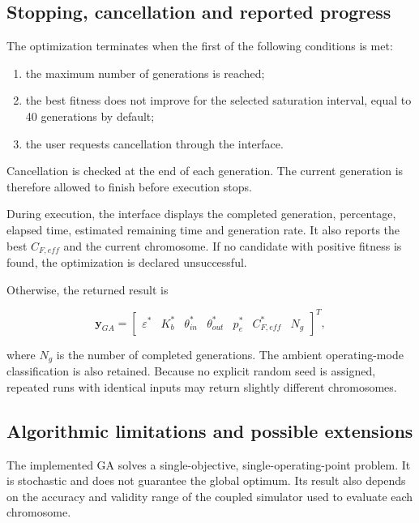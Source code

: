 \subsection{Stopping, cancellation and reported progress}

The optimization terminates when the first of the following conditions is met:

\begin{enumerate}
    \item the maximum number of generations is reached;
    \item the best fitness does not improve for the selected saturation interval,
    equal to 40 generations by default;
    \item the user requests cancellation through the interface.
\end{enumerate}

Cancellation is checked at the end of each generation. The current generation is
therefore allowed to finish before execution stops.

During execution, the interface displays the completed generation, percentage,
elapsed time, estimated remaining time and generation rate. It also reports the best
\(C_{F,eff}\) and the current chromosome. If no candidate with positive fitness is
found, the optimization is declared unsuccessful.

Otherwise, the returned result is

\begin{equation}
\bm{y}_{GA}
=
\begin{bmatrix}
\varepsilon^* &
K_b^* &
\theta_{in}^* &
\theta_{out}^* &
p_e^* &
C_{F,eff}^* &
N_g
\end{bmatrix}^{T},
\label{eq:ga_output}
\end{equation}

where \(N_g\) is the number of completed generations. The ambient operating-mode
classification is also retained. Because no explicit random seed is assigned,
repeated runs with identical inputs may return slightly different chromosomes.


\subsection{Algorithmic limitations and possible extensions}

The implemented GA solves a single-objective, single-operating-point problem. It is
stochastic and does not guarantee the global optimum. Its result also depends on the
accuracy and validity range of the coupled simulator used to evaluate each chromosome.

